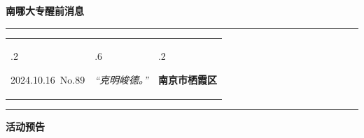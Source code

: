 \documentclass[letterpaper, 12pt]{article}
\begin{document}
\begin{center}
    \Huge\textbf{南哪大专醒前消息}
\end{center}
\vspace{4mm}
\hrule
\renewcommand\tabularxcolumn[1]{m{#1}}
\begin{tabularx}{\textwidth}{>{\hsize.2\hsize}X>{\hsize.6\hsize}X>{\hsize.2\hsize}X}
    \begin{flushleft}
        2024.10.16\, No.89
    \end{flushleft}
    &
    \begin{center}
        \textit{“克明峻德。”}
    \end{center}
    &
    \begin{flushright}
        \textbf{南京市栖霞区}
    \end{flushright}
\end{tabularx}
\vspace{-3.5mm}
\hrule
\vspace{4mm}
\centerline{\huge\textbf{活动预告}}
\end{document}
